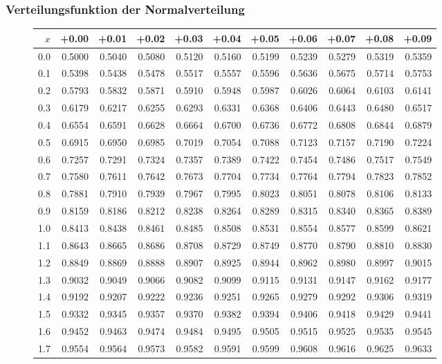\subsubsection{Verteilungsfunktion der Normalverteilung}
\begin{figure}[!h]
\begin{center}
\scriptsize
\begin{tabular}{|r|rrrrrrrrrr|}
\hline
$x$&+0.00&+0.01&+0.02&+0.03&+0.04&+0.05&+0.06&+0.07&+0.08&+0.09\\
\hline
0.0&0.5000&0.5040&0.5080&0.5120&0.5160&0.5199&0.5239&0.5279&0.5319&0.5359\\
0.1&0.5398&0.5438&0.5478&0.5517&0.5557&0.5596&0.5636&0.5675&0.5714&0.5753\\
0.2&0.5793&0.5832&0.5871&0.5910&0.5948&0.5987&0.6026&0.6064&0.6103&0.6141\\
0.3&0.6179&0.6217&0.6255&0.6293&0.6331&0.6368&0.6406&0.6443&0.6480&0.6517\\
0.4&0.6554&0.6591&0.6628&0.6664&0.6700&0.6736&0.6772&0.6808&0.6844&0.6879\\
0.5&0.6915&0.6950&0.6985&0.7019&0.7054&0.7088&0.7123&0.7157&0.7190&0.7224\\
0.6&0.7257&0.7291&0.7324&0.7357&0.7389&0.7422&0.7454&0.7486&0.7517&0.7549\\
0.7&0.7580&0.7611&0.7642&0.7673&0.7704&0.7734&0.7764&0.7794&0.7823&0.7852\\
0.8&0.7881&0.7910&0.7939&0.7967&0.7995&0.8023&0.8051&0.8078&0.8106&0.8133\\
0.9&0.8159&0.8186&0.8212&0.8238&0.8264&0.8289&0.8315&0.8340&0.8365&0.8389\\
1.0&0.8413&0.8438&0.8461&0.8485&0.8508&0.8531&0.8554&0.8577&0.8599&0.8621\\
1.1&0.8643&0.8665&0.8686&0.8708&0.8729&0.8749&0.8770&0.8790&0.8810&0.8830\\
1.2&0.8849&0.8869&0.8888&0.8907&0.8925&0.8944&0.8962&0.8980&0.8997&0.9015\\
1.3&0.9032&0.9049&0.9066&0.9082&0.9099&0.9115&0.9131&0.9147&0.9162&0.9177\\
1.4&0.9192&0.9207&0.9222&0.9236&0.9251&0.9265&0.9279&0.9292&0.9306&0.9319\\
1.5&0.9332&0.9345&0.9357&0.9370&0.9382&0.9394&0.9406&0.9418&0.9429&0.9441\\
1.6&0.9452&0.9463&0.9474&0.9484&0.9495&0.9505&0.9515&0.9525&0.9535&0.9545\\
1.7&0.9554&0.9564&0.9573&0.9582&0.9591&0.9599&0.9608&0.9616&0.9625&0.9633\\

\end{tabular}
\end{center}
\end{figure}

